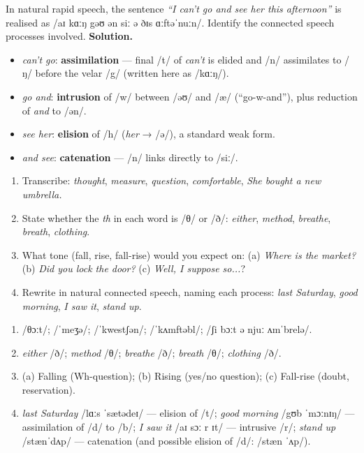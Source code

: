 \documentclass[11pt]{article}
\begin{document}
\begin{exoresolu}
In natural rapid speech, the sentence \emph{``I can't go and see her this afternoon''} is realised as /aɪ kɑːŋ gəʊ ən siː ə ðɪs ɑːftəˈnuːn/. Identify the connected speech processes involved.
\tcblower
\textbf{Solution.}
\begin{itemize}
\item \emph{can't go}: \textbf{assimilation} — final /t/ of \emph{can't} is elided and /n/ assimilates to /ŋ/ before the velar /g/ (written here as /kɑːŋ/).
\item \emph{go and}: \textbf{intrusion} of /w/ between /əʊ/ and /æ/ (``go-w-and''), plus reduction of \emph{and} to /ən/.
\item \emph{see her}: \textbf{elision} of /h/ (\emph{her} → /ə/), a standard weak form.
\item \emph{and see}: \textbf{catenation} — /n/ links directly to /siː/.
\end{itemize}
\end{exoresolu}

\begin{exercice}
\begin{enumerate}
\item Transcribe: \emph{thought}, \emph{measure}, \emph{question}, \emph{comfortable}, \emph{She bought a new umbrella.}
\item State whether the \emph{th} in each word is /θ/ or /ð/: \emph{either}, \emph{method}, \emph{breathe}, \emph{breath}, \emph{clothing}.
\item What tone (fall, rise, fall-rise) would you expect on: (a) \emph{Where is the market?} (b) \emph{Did you lock the door?} (c) \emph{Well, I \emph{suppose} so...}?
\item Rewrite in natural connected speech, naming each process: \emph{last Saturday}, \emph{good morning}, \emph{I saw it}, \emph{stand up}.
\end{enumerate}
\end{exercice}

\begin{corrige}
\begin{enumerate}
\item /θɔːt/; /ˈmeʒə/; /ˈkwestʃən/; /ˈkʌmftəbl/; /ʃi bɔːt ə njuː ʌmˈbrelə/.
\item \emph{either} /ð/; \emph{method} /θ/; \emph{breathe} /ð/; \emph{breath} /θ/; \emph{clothing} /ð/.
\item (a) Falling (Wh-question); (b) Rising (yes/no question); (c) Fall-rise (doubt, reservation).
\item \emph{last Saturday} /lɑːs ˈsætədeɪ/ — elision of /t/; \emph{good morning} /gʊb ˈmɔːnɪŋ/ — assimilation of /d/ to /b/; \emph{I saw it} /aɪ sɔː r ɪt/ — intrusive /r/; \emph{stand up} /stænˈdʌp/ — catenation (and possible elision of /d/: /stæn ˈʌp/).
\end{enumerate}
\end{corrige}
\end{document}
